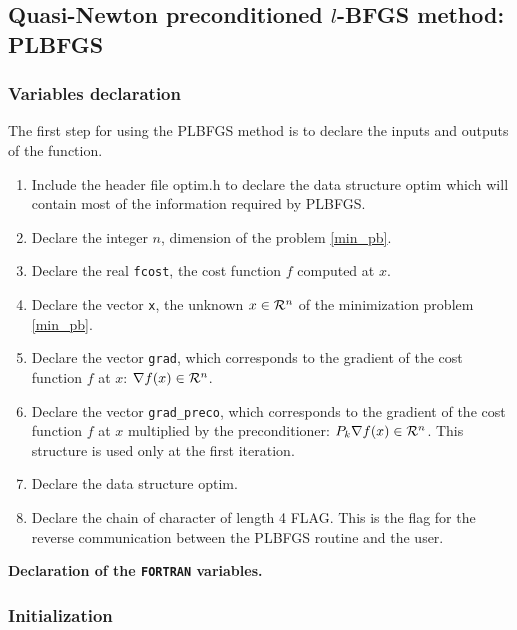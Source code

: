 \documentclass[a4paper,twoside,final,onecolumn,11pt,openright]{article}
\def \mathbb #1{{\cal #1}}
\begin{document}
\newpage
\subsection{Quasi-Newton preconditioned $l$-BFGS method: PLBFGS}

\subsubsection{Variables declaration}
The first step for using the PLBFGS method is to declare the inputs and outputs of the function. 
\begin{enumerate}
 \item Include the header file optim.h to declare the data structure optim which will contain most of the information required by PLBFGS.
 \item Declare the integer $n$, dimension of the problem \eqref{min_pb}.
 \item Declare the real \texttt{fcost}, the cost function $f$ computed at $x$.
 \item Declare the vector \texttt{x}, the unknown $x \in \mathbb{R}^{n}$ of the minimization problem \eqref{min_pb}.
 \item Declare the vector \texttt{grad}, which corresponds to the gradient of the cost function $f$ at $x$: $\nabla f(x) \in \mathbb{R}^{n}$.
 \item Declare the vector \texttt{grad\_preco}, which corresponds to the gradient of the cost function $f$ at $x$ multiplied by the preconditioner: $P_k\nabla f(x) \in \mathbb{R}^{n}$. This structure is used only at the first iteration.
 \item Declare the data structure optim.
 \item Declare the chain of character of length 4 FLAG. This is the flag for the reverse communication between the PLBFGS routine and the user.
\end{enumerate}

\framebox{
\small
 
} 
\normalsize
\begin{center}
\textbf{Declaration of the \texttt{FORTRAN} variables.} 
\end{center}

\subsubsection{Initialization}
\end{document}
